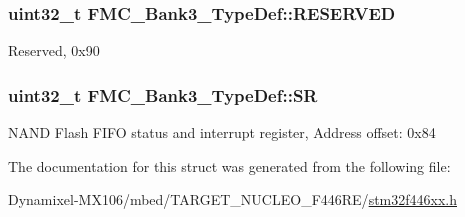 \subsubsection[{\texorpdfstring{R\+E\+S\+E\+R\+V\+ED}{RESERVED}}]{\setlength{\rightskip}{0pt plus 5cm}uint32\+\_\+t F\+M\+C\+\_\+\+Bank3\+\_\+\+Type\+Def\+::\+R\+E\+S\+E\+R\+V\+ED}\hypertarget{struct_f_m_c___bank3___type_def_a778e98be0b9c57bec95e25b2be2ecd72}{}\label{struct_f_m_c___bank3___type_def_a778e98be0b9c57bec95e25b2be2ecd72}
Reserved, 0x90 
\subsubsection[{\texorpdfstring{SR}{SR}}]{ uint32\+\_\+t F\+M\+C\+\_\+\+Bank3\+\_\+\+Type\+Def\+::\+SR}\hypertarget{struct_f_m_c___bank3___type_def_a43af4c901144f747741adbf1a479586a}{}\label{struct_f_m_c___bank3___type_def_a43af4c901144f747741adbf1a479586a}
N\+A\+ND Flash F\+I\+FO status and interrupt register, Address offset\+: 0x84 

The documentation for this struct was generated from the following file\+:\begin{DoxyCompactItemize}
\item 
Dynamixel-\/\+M\+X106/mbed/\+T\+A\+R\+G\+E\+T\+\_\+\+N\+U\+C\+L\+E\+O\+\_\+\+F446\+R\+E/\hyperlink{stm32f446xx_8h}{stm32f446xx.\+h}\end{DoxyCompactItemize}
